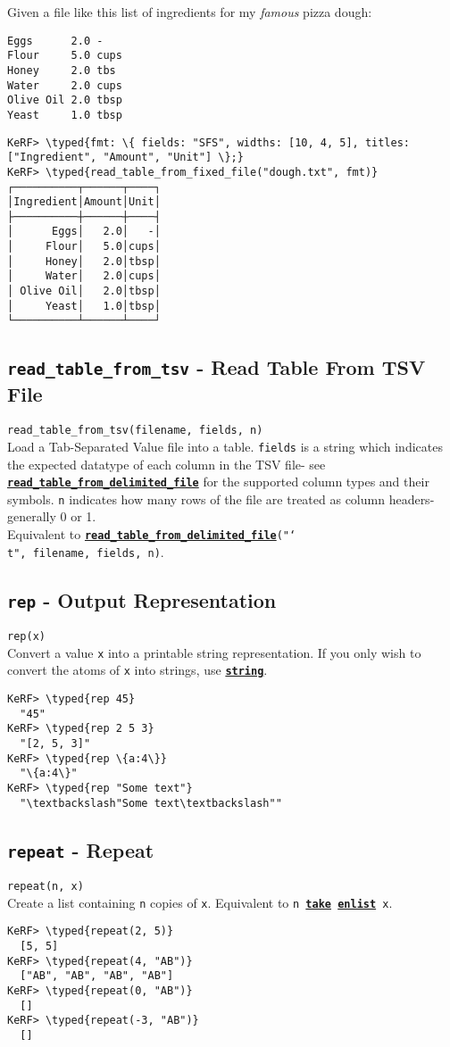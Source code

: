 \documentclass{article}
\newcommand{\typed}[1]{\textcolor{TealBlue}{#1}}
\newcommand{\primdefu}[3]{\subsection{\texttt{#1} - #2}\label{prim:#3}}
\newcommand{\primu}[2]{\hyperref[prim:#2]{\textbf{\texttt{#1}}}}
\newcommand{\primdef}[2]{\primdefu{#1}{#2}{#1}}
\newcommand{\prim}[1]{\primu{#1}{#1}}
\begin{document}
Given a file like this list of ingredients for my \emph{famous} pizza dough:
\begin{Verbatim}
Eggs      2.0 -    
Flour     5.0 cups 
Honey     2.0 tbs  
Water     2.0 cups 
Olive Oil 2.0 tbsp 
Yeast     1.0 tbsp 
\end{Verbatim}

\begin{Verbatim}
KeRF> \typed{fmt: \{ fields: "SFS", widths: [10, 4, 5], titles: ["Ingredient", "Amount", "Unit"] \};}
KeRF> \typed{read_table_from_fixed_file("dough.txt", fmt)}
┌──────────┬──────┬────┐
│Ingredient│Amount│Unit│
├──────────┼──────┼────┤
│      Eggs│   2.0│   -│
│     Flour│   5.0│cups│
│     Honey│   2.0│tbsp│
│     Water│   2.0│cups│
│ Olive Oil│   2.0│tbsp│
│     Yeast│   1.0│tbsp│
└──────────┴──────┴────┘
\end{Verbatim}

\primdefu{read\_table\_from\_tsv}{Read Table From TSV File}{readTableFromTsv}
\texttt{read\_table\_from\_tsv(filename, fields, n)}\\

Load a Tab-Separated Value file into a table. \texttt{fields} is a string which indicates the expected datatype of each column in the TSV file- see \primu{read\_table\_from\_delimited\_file}{readTableFromDelimitedFile} for the supported column types and their symbols. \texttt{n} indicates how many rows of the file are treated as column headers- generally 0 or 1.\\

Equivalent to \texttt{\primu{read\_table\_from\_delimited\_file}{readTableFromDelimitedFile}("\char`\\t", filename, fields, n)}.

\primdef{rep}{Output Representation}
\texttt{rep(x)}\\

Convert a value \texttt{x} into a printable string representation. If you only wish to convert the atoms of \texttt{x} into strings, use \prim{string}.
\begin{Verbatim}
KeRF> \typed{rep 45}
  "45"
KeRF> \typed{rep 2 5 3}
  "[2, 5, 3]"
KeRF> \typed{rep \{a:4\}}
  "\{a:4\}"
KeRF> \typed{rep "Some text"}
  "\textbackslash"Some text\textbackslash""
\end{Verbatim}

\primdef{repeat}{Repeat}
\texttt{repeat(n, x)}\\

Create a list containing \texttt{n} copies of \texttt{x}. Equivalent to \texttt{n \prim{take} \prim{enlist} x}.
\begin{Verbatim}
KeRF> \typed{repeat(2, 5)}
  [5, 5]
KeRF> \typed{repeat(4, "AB")}
  ["AB", "AB", "AB", "AB"]
KeRF> \typed{repeat(0, "AB")}
  []
KeRF> \typed{repeat(-3, "AB")}
  []
\end{Verbatim}
\end{document}
